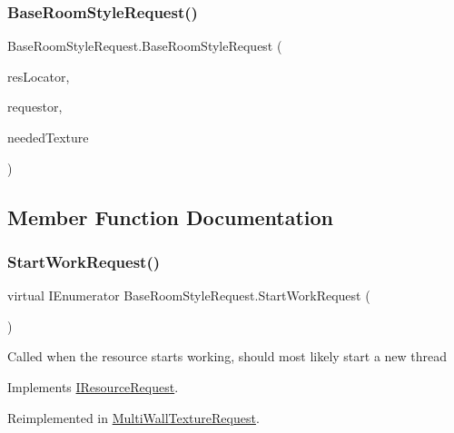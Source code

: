 \subsubsection{\texorpdfstring{Base\+Room\+Style\+Request()}{BaseRoomStyleRequest()}}
{\footnotesize\ttfamily Base\+Room\+Style\+Request.\+Base\+Room\+Style\+Request (\begin{DoxyParamCaption}\item[{int}]{res\+Locator,  }\item[{Game\+Object}]{requestor,  }\item[{\mbox{\hyperlink{class_room_style_resource_a877062d3830671f8376cc30340cdb45f}{Room\+Style\+Resource.\+Texture\+To\+Apply}}}]{needed\+Texture }\end{DoxyParamCaption})}



\subsection{Member Function Documentation}
\mbox{\label{class_base_room_style_request_af2ac2de206ad154351cf6a1b1e7befd5}} 
\subsubsection{\texorpdfstring{Start\+Work\+Request()}{StartWorkRequest()}}
{\footnotesize\ttfamily virtual I\+Enumerator Base\+Room\+Style\+Request.\+Start\+Work\+Request (\begin{DoxyParamCaption}{ }\end{DoxyParamCaption})\hspace{0.3cm}{\ttfamily [virtual]}}



Called when the resource starts working, should most likely start a new thread 



Implements \mbox{\hyperlink{interface_i_resource_request_a5b40a09cb820283600ac9e3f846936f9}{I\+Resource\+Request}}.



Reimplemented in \mbox{\hyperlink{class_multi_wall_texture_request_a9990230b6a9cb6be581b7948f379065b}{Multi\+Wall\+Texture\+Request}}.

